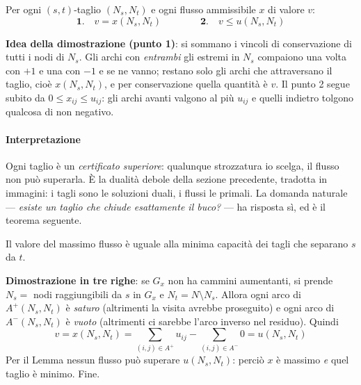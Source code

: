\documentclass[12pt]{extarticle} %
\begin{document}
\begin{tcolorbox}[colback=gray!6, colframe=black!60, title=\textbf{Lemma (dualità debole su rete)}]
Per ogni $(s,t)$-taglio $(N_s,N_t)$ e ogni flusso ammissibile $x$ di valore $v$:
\[
\textbf{1.}\quad v = x(N_s,N_t) \qquad\qquad \textbf{2.}\quad v \le u(N_s,N_t)
\]
\end{tcolorbox}
\noindent \textbf{Idea della dimostrazione (punto 1)}: si sommano i vincoli di conservazione di tutti i nodi di $N_s$. Gli archi con \emph{entrambi} gli estremi in $N_s$ compaiono una volta con $+1$ e una con $-1$ e se ne vanno; restano solo gli archi che attraversano il taglio, cioè $x(N_s,N_t)$, e per conservazione quella quantità è $v$. Il punto 2 segue subito da $0 \le x_{ij} \le u_{ij}$: gli archi avanti valgono al più $u_{ij}$ e quelli indietro tolgono qualcosa di non negativo.

\paragraph{Interpretazione}
Ogni taglio è un \emph{certificato superiore}: qualunque strozzatura io scelga, il flusso non può superarla. È la dualità debole della sezione precedente, tradotta in immagini: i tagli sono le soluzioni duali, i flussi le primali. La domanda naturale --- \emph{esiste un taglio che chiude esattamente il buco?} --- ha risposta sì, ed è il teorema seguente.

\begin{tcolorbox}[colback=red!5, colframe=red!60!black, title=\textbf{Teorema Max-Flow Min-Cut}]
Il valore del massimo flusso è uguale alla minima capacità dei tagli che separano $s$ da $t$.
\end{tcolorbox}
\noindent \textbf{Dimostrazione in tre righe}: se $G_x$ non ha cammini aumentanti, si prende $N_s = $ nodi raggiungibili da $s$ in $G_x$ e $N_t = N \setminus N_s$. Allora ogni arco di $A^+(N_s,N_t)$ è \emph{saturo} (altrimenti la visita avrebbe proseguito) e ogni arco di $A^-(N_s,N_t)$ è \emph{vuoto} (altrimenti ci sarebbe l'arco inverso nel residuo). Quindi
\[
v = x(N_s,N_t) = \sum_{(i,j)\in A^+} u_{ij} - \sum_{(i,j)\in A^-} 0 = u(N_s,N_t)
\]
Per il Lemma nessun flusso può superare $u(N_s,N_t)$: perciò $x$ è massimo \emph{e} quel taglio è minimo. Fine.
\end{document}
